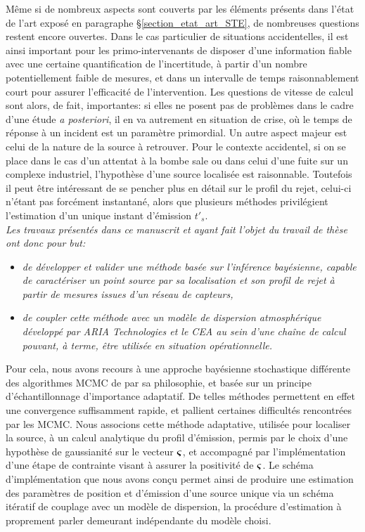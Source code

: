 Même si de nombreux aspects sont couverts par les éléments présents dans l'état de l'art exposé en paragraphe §\ref{section_etat_art_STE}, de nombreuses questions restent encore ouvertes. Dans le cas particulier de situations accidentelles, il est ainsi important pour les primo-intervenants de disposer d'une information fiable avec une certaine quantification de l'incertitude, à partir d'un nombre potentiellement faible de mesures, et dans un intervalle de temps raisonnablement court pour assurer l'efficacité de l'intervention. Les questions de vitesse de calcul sont alors, de fait, importantes: si elles ne posent pas de problèmes dans le cadre d'une étude \textit{a posteriori}, il en va autrement en situation de crise, où le temps de réponse à un incident est un paramètre primordial. Un autre aspect majeur est celui de la nature de la source à retrouver. Pour le contexte accidentel, si on se place dans le cas d'un attentat à la bombe sale ou dans celui d'une fuite sur un complexe industriel, l'hypothèse d'une source localisée est raisonnable. Toutefois il peut être intéressant de se pencher plus en détail sur le profil du rejet, celui-ci n'étant pas forcément instantané, alors que plusieurs méthodes privilégient l'estimation d'un unique instant d'émission $t'_s$. \\


\textit{Les travaux présentés dans ce manuscrit et ayant fait l'objet du travail de thèse ont donc pour but: }

\begin{itemize}
	\item \textit{de développer et valider une méthode basée sur l'inférence bayésienne, capable de caractériser un point source par sa localisation et son profil de rejet à partir de mesures issues d'un réseau de capteurs, }
	\item \textit{de coupler cette méthode avec un modèle de dispersion atmosphérique développé par ARIA Technologies et le CEA au sein d'une chaîne de calcul pouvant, à terme, être utilisée en situation opérationnelle.} \\
\end{itemize}


Pour cela, nous avons recours à une approche bayésienne stochastique différente des algorithmes MCMC de par sa philosophie, et basée sur un principe d'échantillonnage d'importance adaptatif. De telles méthodes permettent en effet une convergence suffisamment rapide, et pallient certaines difficultés rencontrées par les MCMC. Nous associons cette méthode adaptative, utilisée pour localiser la source, à un calcul analytique du profil d'émission, permis par le choix d'une hypothèse de gaussianité sur le vecteur ${\bm{\varsigma}}$, et accompagné par l'implémentation d'une étape de contrainte visant à assurer la positivité de ${\bm{\varsigma}}$. Le schéma d'implémentation que nous avons conçu permet ainsi de produire une estimation des paramètres de position et d'émission d'une source unique via un schéma itératif de couplage avec un modèle de dispersion, la procédure d'estimation à proprement parler demeurant indépendante du modèle choisi. \\

